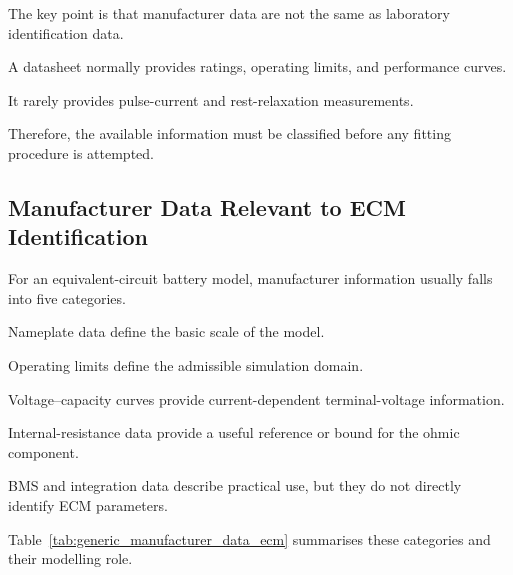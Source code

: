 \documentclass[a4paper,12pt]{article}
\begin{document}
The key point is that manufacturer data are not the same as laboratory identification data.

A datasheet normally provides ratings, operating limits, and performance curves.

It rarely provides pulse-current and rest-relaxation measurements.

Therefore, the available information must be classified before any fitting procedure is attempted.

\subsection{Manufacturer Data Relevant to ECM Identification}

For an equivalent-circuit battery model, manufacturer information usually falls into five categories.

Nameplate data define the basic scale of the model.

Operating limits define the admissible simulation domain.

Voltage--capacity curves provide current-dependent terminal-voltage information.

Internal-resistance data provide a useful reference or bound for the ohmic component.

BMS and integration data describe practical use, but they do not directly identify ECM parameters.

Table~\ref{tab:generic_manufacturer_data_ecm} summarises these categories and their modelling role.
\end{document}
